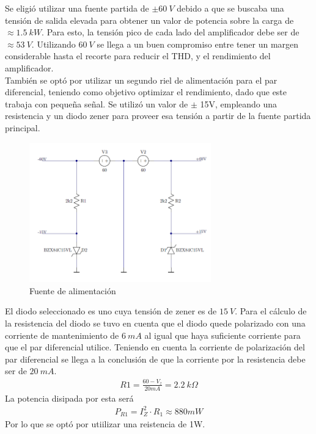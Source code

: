 

Se eligió utilizar una fuente partida de $\pm60 \ V$  debido a que se buscaba una tensión de salida elevada para obtener un valor de potencia sobre la carga de $\approx 1.5 \ kW$. Para esto, la tensión pico de cada lado del amplificador debe ser de $\approx 53 \ V$. Utilizando $60 \ V$ se llega a un buen compromiso entre tener un margen considerable hasta el recorte para reducir el THD, y el rendimiento del amplificador.\\ 
También se optó por utilizar un segundo riel de alimentación para el par diferencial, teniendo como objetivo optimizar el rendimiento, dado que este trabaja con pequeña señal. Se utilizó un valor de $\pm$ 15V, empleando una resistencia y un diodo zener para proveer esa tensión a partir de la fuente partida principal.
\begin{figure}[H]
\centering
	\includegraphics[width=0.7\textwidth]{ImagenesAlimentacion/al.png}
	\caption{Fuente de alimentación}
	\label{fig:alimentacion}
\end{figure}
El diodo seleccionado es uno cuya tensión de zener es de $15 \ V$.
Para el cálculo de la resistencia del diodo se tuvo en cuenta que el diodo quede polarizado con una corriente de mantenimiento de $6 \ mA$ al igual que haya suficiente corriente para que el par diferencial utilice. Teniendo en cuenta la corriente de polarización del par diferencial se llega a la conclusión de que la corriente por la resistencia debe ser de $20 \ mA$.
\begin{align}
R1=\frac{60-V_z}{20mA}= 2.2 \ k\Omega
\end{align}
La potencia disipada por esta será
\begin{align}
P_{R1}= I_Z^2 \cdot R_1 \approx 880mW
\end{align}
Por lo que se optó por utiilizar una reistencia de 1W. 
